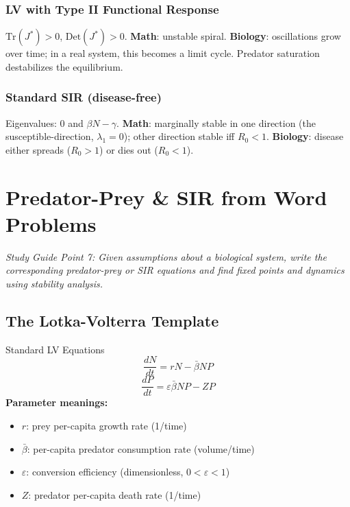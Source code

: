 \documentclass[11pt]{article}
\begin{document}
\subsubsection{LV with Type II Functional Response}
$\text{Tr}(J^*) > 0$, $\text{Det}(J^*) > 0$. \textbf{Math}: unstable spiral. \textbf{Biology}: oscillations grow over time; in a real system, this becomes a limit cycle. Predator saturation destabilizes the equilibrium.

\subsubsection{Standard SIR (disease-free)}
Eigenvalues: $0$ and $\beta N - \gamma$. \textbf{Math}: marginally stable in one direction (the susceptible-direction, $\lambda_1 = 0$); other direction stable iff $R_0 < 1$.\textbf{ Biology}: disease either spreads ($R_0>1$) or dies out ($R_0<1$).

\section{Predator-Prey \& SIR from Word Problems}

\textit{Study Guide Point 7: Given assumptions about a biological system, write the corresponding predator-prey or SIR equations and find fixed points and dynamics using stability analysis.}

\subsection{The Lotka-Volterra Template}

\begin{conceptbox}{Standard LV Equations}
\[
\frac{dN}{dt} = rN - \bar\beta NP
\]
\[
\frac{dP}{dt} = \varepsilon\bar\beta NP - ZP
\]
\textbf{Parameter meanings:}
\begin{itemize}
\item $r$: prey per-capita growth rate (1/time)
\item $\bar\beta$: per-capita predator consumption rate (volume/time)
\item $\varepsilon$: conversion efficiency (dimensionless, $0 < \varepsilon < 1$)
\item $Z$: predator per-capita death rate (1/time)
\end{itemize}
\end{conceptbox}
\end{document}
